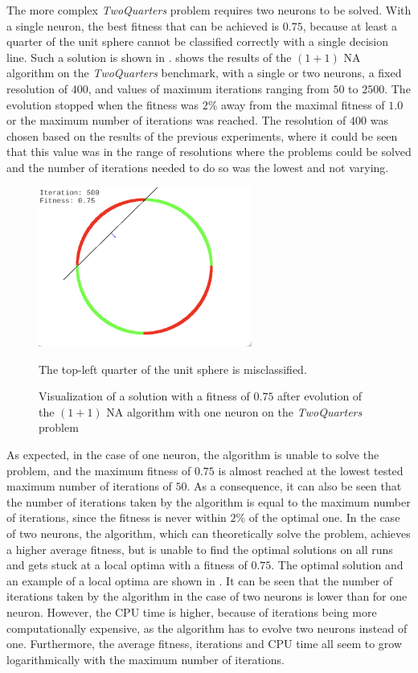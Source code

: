 The more complex \textit{TwoQuarters} problem requires two neurons to be solved. With a single neuron, the best fitness that can be achieved is $0.75$, because at least a quarter of the unit sphere
cannot be classified correctly with a single decision line. Such a solution is shown in .
 shows the results of the $(1 + 1)$ NA algorithm on the \textit{TwoQuarters} benchmark, with a single or two neurons,
a fixed resolution of $400$, and values of maximum iterations ranging from $50$ to $2500$. The evolution stopped when the fitness was $2\%$ away from the maximal fitness of $1.0$ or
the maximum number of iterations was reached. The resolution of $400$ was chosen based on the results of the previous experiments, where it could be seen that this value was in the range of
resolutions where the problems could be solved and the number of iterations needed to do so was the lowest and not varying.

\begin{figure}
    \centering
    \includegraphics[width=7cm]{Pictures/twoquarters-single}
    \caption{Visualization of a solution with a fitness of $0.75$ after evolution of the $(1 + 1)$ NA algorithm with one neuron on the \textit{TwoQuarters} problem}
    {The top-left quarter of the unit sphere is misclassified.}
    \label{fig:na_twoquarters_single_visual}
\end{figure}

As expected, in the case of one neuron, the algorithm is unable to solve the problem, and the maximum fitness of $0.75$ is almost reached at the lowest tested maximum number of iterations of $50$.
As a consequence, it can also be seen that the number of iterations taken by the algorithm is equal to the maximum number of iterations, since the fitness is never within $2\%$ of the optimal one.
In the case of two neurons, the algorithm, which can theoretically solve the problem, achieves a higher average fitness, but is unable to find the optimal solutions on all runs and gets stuck
at a local optima with a fitness of $0.75$. The optimal solution and an example of a local optima are shown in .
It can be seen that the number of iterations taken by the algorithm in the case of two neurons is lower than for one neuron. However, the CPU time is higher, because of iterations being more
computationally expensive, as the algorithm has to evolve two neurons instead of one.
Furthermore, the average fitness, iterations and CPU time all seem to grow logarithmically with the maximum number of iterations.


